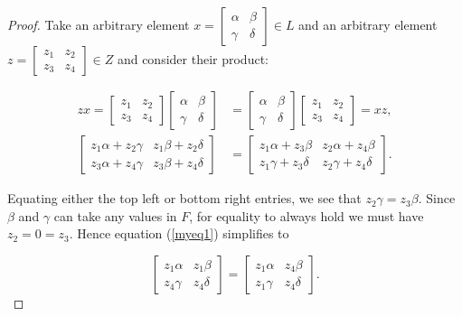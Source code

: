 \begin{proof} Take an arbitrary element $x=\begin{bmatrix} \alpha & \beta \\ \gamma & \delta \end{bmatrix} \in L$ and  an arbitrary element $z = \begin{bmatrix} z_1 & z_2 \\ z_3 & z_4 \end{bmatrix} \in Z$ and consider their product:

\begin{align}\label{myeq1} zx = \begin{bmatrix} z_1 & z_2 \\ z_3 & z_4 \end{bmatrix} \begin{bmatrix} \alpha & \beta \\ \gamma & \delta \end{bmatrix} &= \begin{bmatrix} \alpha & \beta \\ \gamma & \delta \end{bmatrix} \begin{bmatrix} z_1 & z_2 \\ z_3 & z_4 \end{bmatrix} = xz, \nonumber \\[1.5ex]
\begin{bmatrix} z_1 \alpha + z_2 \gamma & z_1 \beta + z_2 \delta \\ z_3 \alpha + z_4 \gamma & z_3 \beta + z_4 \delta \end{bmatrix} &= \begin{bmatrix} z_1 \alpha + z_3 \beta & z_2 \alpha + z_4 \beta \\ z_1 \gamma + z_3 \delta & z_2 \gamma + z_4 \delta \end{bmatrix}.
\end{align}

\noindent Equating either the top left or bottom right entries, we see that $z_2 \gamma = z_3 \beta$. Since $\beta$ and $\gamma$ can take any values in $F$, for equality to always hold we must have $z_2 = 0 = z_3$. Hence equation (\ref{myeq1}) simplifies to

\begin{equation*} \begin{bmatrix} z_1 \alpha & z_1 \beta \\ z_4 \gamma & z_4 \delta \end{bmatrix} = \begin{bmatrix} z_1 \alpha & z_4 \beta \\ z_1 \gamma & z_4 \delta \end{bmatrix}. \end{equation*}


\end{proof}
